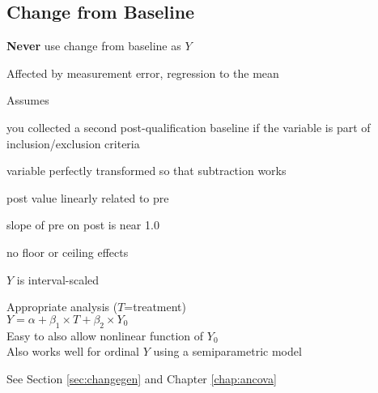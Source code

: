 \subsection{Change from Baseline}\label{sec:overview-change}
\textbf{Never} use change from baseline as $Y$
  \bi
  \item Affected by measurement error, regression to the mean
  \item Assumes
    \bi
    \item you collected a second post-qualification baseline if the
      variable is part of inclusion/exclusion criteria
    \item variable perfectly transformed so that subtraction works
    \item post value linearly related to pre
    \item slope of pre on post is near 1.0
    \item no floor or ceiling effects
    \item $Y$ is interval-scaled
    \ei
  \item Appropriate analysis ($T$=treatment) \\
  $Y = \alpha + \beta_{1}\times T + \beta_{2} \times Y_{0}$ \\
  Easy to also allow nonlinear function of $Y_{0}$\\
  Also works well for ordinal $Y$ using a semiparametric model
  \item See Section \ref{sec:changegen} and Chapter \ref{chap:ancova}
  \ei


